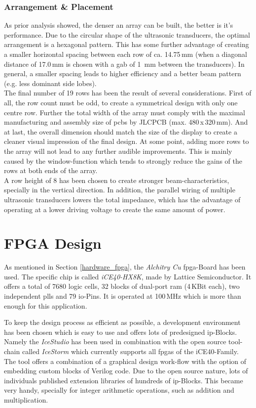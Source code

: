 \subsubsection{Arrangement \& Placement}
As prior analysis showed, the denser an array can be built, the better is it's performance. Due to the circular shape of the ultrasonic transducers, the optimal arrangement is a hexagonal pattern. This has some further advantage of creating a smaller horizontal spacing between each row of ca. 14.75\,mm (when a diagonal distance of 17.0\,mm is chosen with a gab of 1\, mm between the transducers). In general, a smaller spacing leads to higher efficiency and a better beam pattern (e.g. less dominant side lobes).\\
The final number of 19 rows has been the result of several considerations. First of all, the row count must be odd, to create a symmetrical design with only one centre row. Further the total width of the array must comply with the maximal manufacturing and assembly size of \acrshort{pcb}s by JLCPCB (max. 480\,x\,320\,mm). And at last, the overall dimension should match the size of the display to create a cleaner visual impression of the final design. At some point, adding more rows to the array will not lead to any further audible improvements. This is mainly caused by the window-function which tends to strongly reduce the gains of the rows at both ends of the array.\\
A row height of 8 has been chosen to create stronger beam-characteristics, specially in the vertical direction. In addition, the parallel wiring of multiple ultrasonic transducers lowers the total impedance, which has the advantage of operating at a lower driving voltage to create the same amount of power.

\newpage
\section{FPGA Design}
As mentioned in Section \ref{hardware_fpga}, the \textit{Alchitry Cu} \acrshort{fpga}-Board has been used. The specific chip is called \textit{iCE40-HX8K}, made by Lattice Semiconductor. It offers a total of 7680 logic cells, 32 blocks of dual-port \acrshort{ram} (4\,KBit each), two independent \acrshort{pll}s and 79 \acrshort{io}-Pins. It is operated at 100\,MHz which is more than enough for this application.

To keep the design process as efficient as possible, a development environment has been chosen which is easy to use and offers lots of predesigned \acrshort{ip}-Blocks. Namely the \textit{IceStudio} has been used in combination with the open source tool-chain called \textit{IceStorm} which currently supports all \acrshort{fpga}s of the iCE40-Family.\\
The tool offers a combination of a graphical design work-flow with the option of embedding custom blocks of Verilog code. Due to the open source nature, lots of individuals published extension libraries of hundreds of \acrshort{ip}-Blocks. This became very handy, specially for integer arithmetic operations, such as addition and multiplication.



